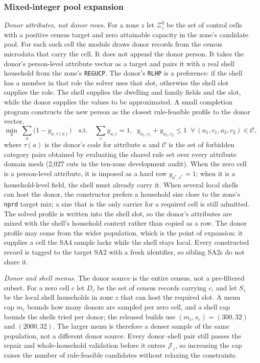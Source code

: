 \subsubsection*{Mixed-integer pool expansion}
\label{sec:mip_expansion_formulation}

\emph{Donor attributes, not donor rows.} For a zone $z$ let
$\mathcal{Z}_z^0$ be the set of control cells with a positive census target and
zero attainable capacity in the zone's candidate pool. For each such cell the
module draws donor records from the census microdata that carry the cell. It does
not append the donor person. It takes the donor's person-level attribute vector
as a target and pairs it with a real shell household from the zone's
\texttt{REGUCP}. The donor's \texttt{RLHP} is a preference: if the shell has a
member in that role the solver uses that slot, otherwise the shell slot supplies
the role. The shell supplies the dwelling and family fields and the slot, while
the donor supplies the values to be approximated. A small completion program
constructs the new person as the closest rule-feasible profile to the donor
vector,
\begin{equation}
\min_{y}\;\sum_{a}\bigl(1-y_{a,\tau(a)}\bigr)
\quad\text{s.t.}\quad
\sum_{c} y_{a,c}=1,\;\;
y_{a_1,c_1}+y_{a_2,c_2}\le 1 \;\;\forall\,(a_1,c_1,a_2,c_2)\in\mathcal{C},
\label{eq:mip_repair}
\end{equation}
where $\tau(a)$ is the donor's code for attribute $a$ and $\mathcal{C}$ is the
set of forbidden category pairs obtained by evaluating the shared rule set over
every attribute domain mesh (2{,}027 cuts in the ten-zone development audit).
When the zero cell is a person-level attribute, it is imposed as a hard row
$y_{a^*,c^*}=1$; when it is a household-level field, the shell must already
carry it. When several local shells can host the donor, the constructor prefers a
household size close to the zone's \texttt{nprd} target mix; a size that is the
only carrier for a required cell is still admitted. The solved profile is
written into the shell slot, so the donor's attributes are mixed with the shell's
household context rather than copied as a row. The donor profile may come from the wider population, which is the point of
expansion: it supplies a cell the SA4 sample lacks while the shell stays local.
Every constructed record is tagged to the target SA2 with a fresh identifier, so
sibling SA2s do not share it.

\emph{Donor and shell menus.} The donor source is the entire census, not a
pre-filtered subset. For a zero cell $c$ let $D_c$ be the set of census records
carrying $c$, and let $S_z$ be the local shell households in zone $z$ that can
host the required slot. A menu cap $m_c$ bounds how many donors are sampled per
zero cell, and a shell cap bounds the shells tried per donor; the released
builds use $(m_c,s_c)=(300,32)$ and $(2000,32)$. The larger menu is therefore a
denser sample of the same population, not a different donor source. Every
donor--shell pair still passes the repair and whole-household validation before
it enters $\mathcal{J}_z$, so increasing the cap raises the number of
rule-feasible candidates without relaxing the constraints.

